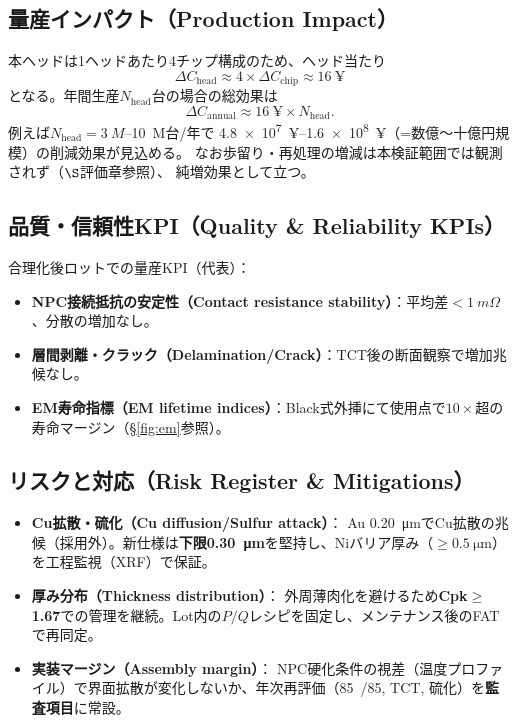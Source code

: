 \documentclass[conference]{IEEEtran}
\begin{document}
\subsection{量産インパクト（Production Impact）}
本ヘッドは1ヘッドあたり4チップ構成のため、ヘッド当たり
\[
 \Delta C_{\mathrm{head}} \approx 4 \times \Delta C_{\mathrm{chip}} \approx \SI{16}{¥}
\]
となる。年間生産$N_{\mathrm{head}}$台の場合の総効果は
\begin{equation}
 \Delta C_{\mathrm{annual}} \approx \SI{16}{¥}\times N_{\mathrm{head}}.
\end{equation}
例えば$N_{\mathrm{head}}=\SI{3}{M}$--\SI{10}{M}台/年で
\SI{4.8e7}{¥}--\SI{1.6e8}{¥}（=数億〜十億円規模）の削減効果が見込める。
なお歩留り・再処理の増減は本検証範囲では観測されず（$\S$評価章参照）、
純増効果として立つ。

\subsection{品質・信頼性KPI（Quality \& Reliability KPIs）}
合理化後ロットでの量産KPI（代表）：
\begin{itemize}
  \item \textbf{NPC接続抵抗の安定性（Contact resistance stability）}：平均差$<\SI{1}{m\Omega}$、分散の増加なし。
  \item \textbf{層間剥離・クラック（Delamination/Crack）}：TCT後の断面観察で増加兆候なし。
  \item \textbf{EM寿命指標（EM lifetime indices）}：Black式外挿にて使用点で$10\times$超の寿命マージン（\S\ref{fig:em}参照）。
\end{itemize}

\subsection{リスクと対応（Risk Register \& Mitigations）}
\begin{itemize}
  \item \textbf{Cu拡散・硫化（Cu diffusion/Sulfur attack）}：
  Au \SI{0.20}{\micro\meter}でCu拡散の兆候（採用外）。新仕様は\textbf{下限\SI{0.30}{\micro\meter}}を堅持し、Niバリア厚み（$\ge\SI{0.5}{\micro\meter}$）を工程監視（XRF）で保証。
  \item \textbf{厚み分布（Thickness distribution）}：
  外周薄肉化を避けるため\textbf{Cpk$\ge$1.67}での管理を継続。Lot内の$P\!/\!Q$レシピを固定し、メンテナンス後のFATで再同定。
  \item \textbf{実装マージン（Assembly margin）}：
  NPC硬化条件の視差（温度プロファイル）で界面拡散が変化しないか、年次再評価（\SI{85}{/}\SI{85}{}, TCT, 硫化）を\textbf{監査項目}に常設。
\end{itemize}
\end{document}
